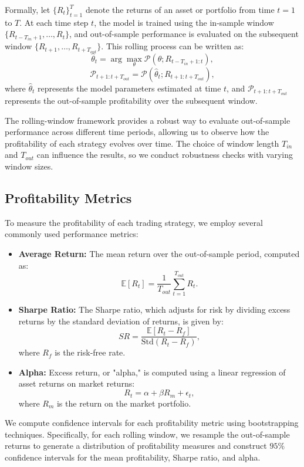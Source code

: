 Formally, let $\{R_t\}_{t=1}^{T}$ denote the returns of an asset or portfolio from time $t=1$ to $T$. At each time step $t$, the model is trained using the in-sample window $\{R_{t-T_{in}+1}, \dots, R_{t}\}$, and out-of-sample performance is evaluated on the subsequent window $\{R_{t+1}, \dots, R_{t+T_{out}}\}$. This rolling process can be written as:
\[
\hat{\theta}_t = \arg \max_{\theta} \mathcal{P}(\theta; R_{t-T_{in}+1:t}),
\]
\[
\mathcal{P}_{t+1:t+T_{out}} = \mathcal{P}(\hat{\theta}_t; R_{t+1:t+T_{out}}),
\]
where $\hat{\theta}_t$ represents the model parameters estimated at time $t$, and $\mathcal{P}_{t+1:t+T_{out}}$ represents the out-of-sample profitability over the subsequent window.

The rolling-window framework provides a robust way to evaluate out-of-sample performance across different time periods, allowing us to observe how the profitability of each strategy evolves over time. The choice of window length $T_{in}$ and $T_{out}$ can influence the results, so we conduct robustness checks with varying window sizes.

\subsection{Profitability Metrics}

To measure the profitability of each trading strategy, we employ several commonly used performance metrics:
\begin{itemize}
    \item \textbf{Average Return:} The mean return over the out-of-sample period, computed as:
    \[
    \mathbb{E}[R_t] = \frac{1}{T_{out}} \sum_{t=1}^{T_{out}} R_t.
    \]
    \item \textbf{Sharpe Ratio:} The Sharpe ratio, which adjusts for risk by dividing excess returns by the standard deviation of returns, is given by:
    \[
    SR = \frac{\mathbb{E}[R_t - R_f]}{\text{Std}(R_t - R_f)},
    \]
    where $R_f$ is the risk-free rate.
    \item \textbf{Alpha:} Excess return, or "alpha," is computed using a linear regression of asset returns on market returns:
    \[
    R_t = \alpha + \beta R_m + \epsilon_t,
    \]
    where $R_m$ is the return on the market portfolio.
\end{itemize}

We compute confidence intervals for each profitability metric using bootstrapping techniques. Specifically, for each rolling window, we resample the out-of-sample returns to generate a distribution of profitability measures and construct $95\%$ confidence intervals for the mean profitability, Sharpe ratio, and alpha.

